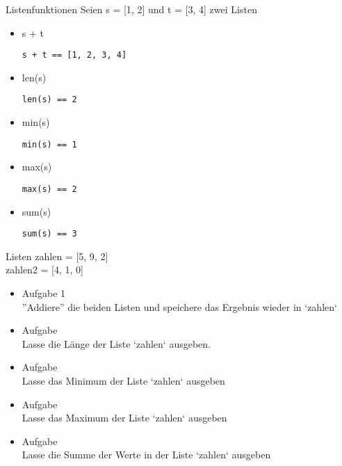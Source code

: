 \begin{frame}[fragile]{Listenfunktionen}
Seien s = [1, 2] und t = [3, 4] zwei Listen
\begin{itemize}
\item s + t 
\begin{lstlisting}
s + t == [1, 2, 3, 4]
\end{lstlisting}
\item len(s) 
\begin{lstlisting}
len(s) == 2
\end{lstlisting}
\item min(s)
\begin{lstlisting}
min(s) == 1
\end{lstlisting}
\item max(s) 
\begin{lstlisting}
max(s) == 2
\end{lstlisting}
\item sum(s) 
\begin{lstlisting}
sum(s) == 3
\end{lstlisting}
\end{itemize}
\end{frame}



\begin{frame}[fragile]{Listen}
zahlen = [5, 9, 2]\\
zahlen2 = [4, 1, 0]
\begin{itemize}
\item Aufgabe 1\\
''Addiere'' die beiden Listen und speichere das Ergebnis wieder in `zahlen`

\item Aufgabe \\
Lasse die Länge der Liste `zahlen` ausgeben. 

\item Aufgabe \\
Lasse das Minimum der Liste `zahlen` ausgeben

\item Aufgabe \\
Lasse das Maximum der Liste `zahlen` ausgeben

\item Aufgabe \\
Lasse die Summe der Werte in der Liste `zahlen` ausgeben
\end{itemize}
\end{frame}

